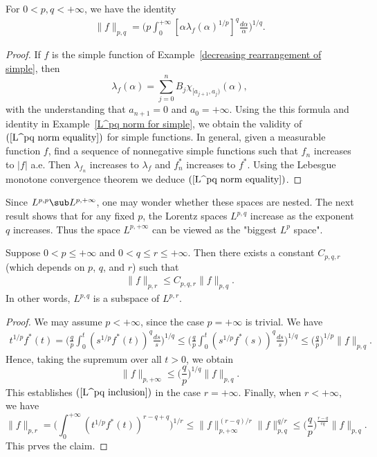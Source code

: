 \begin{proposition}
For $0<p,q<+\infty$, we have the identity
\begin{align}\label{L^pq norm equality}
\|f\|_{p,q}=\Big(p\int_{0}^{+\infty}[\alpha\lambda_f(\alpha)^{1/p}]^q\frac{d\alpha}{\alpha}\Big)^{1/q}.
\end{align}
\end{proposition}
\begin{proof}
If $f$ is the simple function of Example~\ref{decreasing rearrangement of simple}, then
\[\lambda_f(\alpha)=\sum_{j=0}^{n}B_j\chi_{[a_{j+1},a_j)}(\alpha),\]
with the understanding that $a_{n+1}=0$ and $a_0=+\infty$. Using the this formula and identity in Example~\ref{L^pq norm for simple}, we obtain the validity of $(\ref{L^pq norm equality})$ for simple functions. In general, given a measurable function $f$, find a sequence of nonnegative simple functions such that $f_n$ increases to $|f|$ a.e. Then $\lambda_{f_n}$ increases to $\lambda_f$ and $f_n^*$ increases to $f^*$. Using the Lebesgue monotone convergence theorem we deduce $(\ref{L^pq norm equality})$.
\end{proof}
Since $L^{p,p}\sub L^{p,+\infty}$, one may wonder whether these spaces are nested. The next result shows that for any fixed $p$, the Lorentz spaces $L^{p,q}$ increase as the exponent $q$ increases. Thus the space $L^{p,+\infty}$ can be viewed as the "biggest $L^p$ space".
\begin{proposition}
Suppose $0<p\leq+\infty$ and $0<q\leq r\leq+\infty$. Then there exists a constant $C_{p,q,r}$ (which depends on $p$, $q$, and $r$) such that
\begin{align}\label{L^pq inclusion}
\|f\|_{p,r}\leq C_{p,q,r}\|f\|_{p,q}.
\end{align}
In other words, $L^{p,q}$ is a subspace of $L^{p,r}$.
\end{proposition}
\begin{proof}
We may assume $p<+\infty$, since the case $p=+\infty$ is trivial. We have
\begin{align*}
t^{1/p}f^*(t)=\Big(\frac{q}{p}\int_{0}^{t}(s^{1/p}f^*(t))^q\frac{ds}{s}\Big)^{1/q}\leq \Big(\frac{q}{p}\int_{0}^{t}(s^{1/p}f^*(s))^q\frac{ds}{s}\Big)^{1/q}\leq\Big(\frac{q}{p}\Big)^{1/p}\|f\|_{p,q}.
\end{align*}
Hence, taking the supremum over all $t>0$, we obtain
\[\|f\|_{p,+\infty}\leq\Big(\frac{q}{p}\Big)^{1/q}\|f\|_{p,q}.\]
This establishes $(\ref{L^pq inclusion})$ in the case $r=+\infty$. Finally, when $r<+\infty$, we have
\[\|f\|_{p,r}=\Big(\int_{0}^{+\infty}(t^{1/p}f^*(t))^{r-q+q}\Big)^{1/r}\leq\|f\|_{p,+\infty}^{(r-q)/r}\|f\|_{p,q}^{q/r}\leq\Big(\frac{q}{p}\Big)^{\frac{r-q}{rq}}\|f\|_{p,q}.\]
This prves the claim.
\end{proof}
